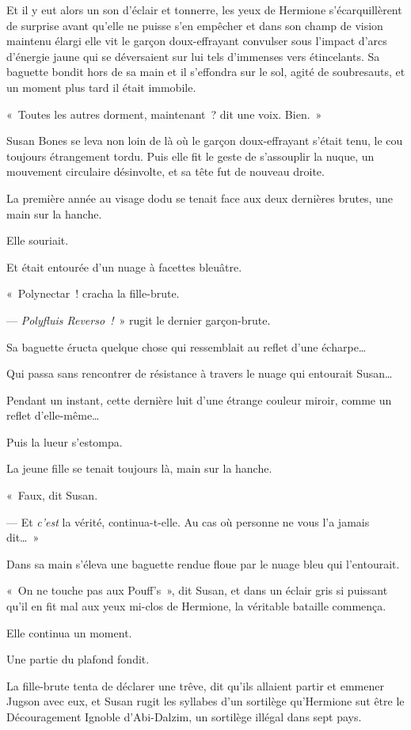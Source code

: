 Et il y eut alors un son d'éclair et tonnerre, les yeux de Hermione s'écarquillèrent de surprise avant qu'elle ne puisse s'en empêcher et dans son champ de vision maintenu élargi elle vit le garçon doux-effrayant convulser sous l'impact d'arcs d'énergie jaune qui se déversaient sur lui tels d'immenses vers étincelants.
Sa baguette bondit hors de sa main et il s'effondra sur le sol, agité de soubresauts, et un moment plus tard il était immobile.

«~Toutes les autres dorment, maintenant~? dit une voix.
Bien.~»

Susan Bones se leva non loin de là où le garçon doux-effrayant s'était tenu, le cou toujours étrangement tordu.
Puis elle fit le geste de s'assouplir la nuque, un mouvement circulaire désinvolte, et sa tête fut de nouveau droite.

La première année au visage dodu se tenait face aux deux dernières brutes, une main sur la hanche.

Elle souriait.

Et était entourée d'un nuage à facettes bleuâtre.

«~Polynectar~! cracha la fille-brute.

--- \emph{Polyfluis Reverso~!}~» rugit le dernier garçon-brute.

Sa baguette éructa quelque chose qui ressemblait au reflet d'une écharpe…

Qui passa sans rencontrer de résistance à travers le nuage qui entourait Susan…

Pendant un instant, cette dernière luit d'une étrange couleur miroir, comme un reflet d'elle-même…

Puis la lueur s'estompa.

La jeune fille se tenait toujours là, main sur la hanche.

«~Faux, dit Susan.

--- Et \emph{c'est} la vérité, continua-t-elle.
Au cas où personne ne vous l'a jamais dit…~»

Dans sa main s'éleva une baguette rendue floue par le nuage bleu qui l'entourait.

«~On ne touche pas aux Pouff's~», dit Susan, et dans un éclair gris si puissant qu'il en fit mal aux yeux mi-clos de Hermione, la véritable bataille commença.

Elle continua un moment.

Une partie du plafond fondit.

La fille-brute tenta de déclarer une trêve, dit qu'ils allaient partir et emmener Jugson avec eux, et Susan rugit les syllabes d'un sortilège qu'Hermione sut être le Découragement Ignoble d'Abi-Dalzim, un sortilège illégal dans sept pays.

